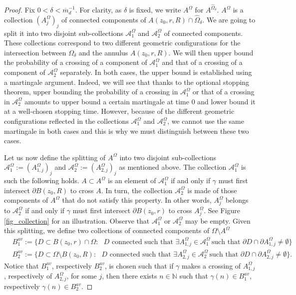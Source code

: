 \documentclass{article}
\theoremstyle{definition}
\theoremstyle{remark}
\theoremstyle{remark}
\begin{document}
\begin{proof}
Fix $0 < \delta < \overline{m}_d^{-1}$. For clarity, as $\delta$ is fixed, we write $A^{\Omega}$ for $A^{\hat \Omega_{\delta}}$. $A^{\Omega}$ is a collection $(A^{\Omega}_j)_j$ of connected components of $A(z_0,r,R) \cap \hat \Omega_{\delta}$. We are going to split it into two disjoint sub-collections $\mathcal{A}_1^{\Omega}$ and $\mathcal{A}_2^{\Omega}$ of connected components. These collections correspond to two different geometric configurations for the intersection between $\Omega_{\delta}$ and the annulus $A(z_0,r,R)$. We will then upper bound the probability of a crossing of a component of $\mathcal{A}_1^{\Omega}$ and that of a crossing of a component of $\mathcal{A}_2^{\Omega}$ separately. In both cases, the upper bound is established using a martingale argument. Indeed, we will see that thanks to the optional stopping theorem, upper bounding the probability of a crossing in $\mathcal{A}_1^{\Omega}$ or that of a crossing in $\mathcal{A}_2^{\Omega}$ amounts to upper bound a certain martingale at time $0$ and lower bound it at a well-chosen stopping time. However, because of the different geometric configurations reflected in the collections $\mathcal{A}_1^{\Omega}$ and $\mathcal{A}_2^{\Omega}$, we cannot use the same martingale in both cases and this is why we must distinguish between these two cases.

Let us now define the splitting of $A^{\Omega}$ into two disjoint sub-collections $\mathcal{A}_1^{\Omega}:=(A^{\Omega}_{1,j})_j$ and $\mathcal{A}^{\Omega}_2:=(A^{\Omega}_{2,j})_j$ as mentioned above. The collection $\mathcal{A}^{\Omega}_1$ is such the following holds. $A \subset A^{\Omega}$ is an element of $\mathcal{A}^{\Omega}_1$ if and only if $\gamma$ must first intersect $\partial B(z_0,R)$ to cross $A$. In turn, the collection $\mathcal{A}^{\Omega}_2$ is made of those components of $A^{\Omega}$ that do not satisfy this property. In other words, $A^{\Omega}_j$ belongs to $\mathcal{A}^{\Omega}_2$ if and only if $\gamma$ must first intersect $\partial B(z_0,r)$ to cross $A^{\Omega}_j$. See Figure \ref{fig_collection} for an illustration. Observe that $\mathcal{A}^{\Omega}_1$ or $\mathcal{A}^{\Omega}_2$ may be empty. Given this splitting, we define two collections of connected components of $\Omega \setminus A^{\Omega}$
\begin{align*}
    &B_1^{av} :=\big \{ D \subset B(z_0,r) \cap \Omega: \text{ $D$ connected such that } \exists A_{1,j}^{\Omega} \in \mathcal{A}_1^{\Omega} \, \text{such that } \partial D \cap \partial A_{1,j}^{\Omega} \neq \emptyset \big\} \\
    &B_2^{av} :=\big \{ D \subset \Omega \setminus B(z_0,R): \text{ $D$ connected such that } \exists A_{2,j}^{\Omega} \in \mathcal{A}_2^{\Omega} \, \text{such that } \partial D \cap \partial A_{2,j}^{\Omega} \neq \emptyset \big\}.
\end{align*}
Notice that $B_1^{av}$, respectively $B_2^{av}$, is chosen such that if $\gamma$ makes a crossing of $A_{1,j}^{\Omega}$, respectively of $A_{2,j}^{\Omega}$, for some $j$, then there exists $n \in \mathbb{N}$ such that $\gamma(n) \in B_{1}^{av}$, respectively $\gamma(n) \in B_{2}^{av}$.


\end{proof}
\end{document}
